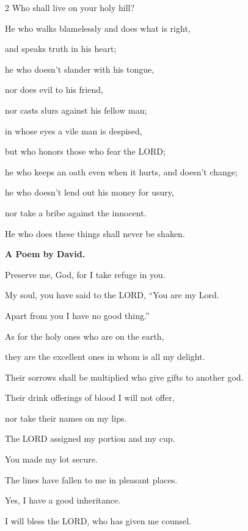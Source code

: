 \begin{multicols}{2}
	Who shall live on your holy hill?
	
	
	\myverse{}He who walks blamelessly and does what is right,
	
	and speaks truth in his heart;
	
	
	\myverse{}he who doesn’t slander with his tongue,
	
	nor does evil to his friend,
	
	nor casts slurs against his fellow man;
	
	
	\myverse{}in whose eyes a vile man is despised,
	
	but who honors those who fear the LORD;
	
	he who keeps an oath even when it hurts, and doesn’t change;
	
	
	\myverse{}he who doesn’t lend out his money for usury,
	
	nor take a bribe against the innocent.
	
	\vspace{\baselineskip}
	He who does these things shall never be shaken.
	
	
	\mychapter{}\textbf{A Poem by David.}
	
	\quad \myverse*{}Preserve me, God, for I take refuge in you.
	
	
	\myverse{}My soul, you have said to the LORD, “You are my Lord.
	
	Apart from you I have no good thing.”
	
	
	\myverse{}As for the holy ones who are on the earth,
	
	they are the excellent ones in whom is all my delight.
	
	\vspace{\baselineskip}
	
	\myverse{}Their sorrows shall be multiplied who give gifts to another god.
	
	Their drink offerings of blood I will not offer,
	
	nor take their names on my lips.
	
	
	\myverse{}The LORD assigned my portion and my cup.
	
	You made my lot secure.
	
	\vspace{\baselineskip}
	
	\myverse{}The lines have fallen to me in pleasant places.
	
	Yes, I have a good inheritance.
	
	
	\myverse{}I will bless the LORD, who has given me counsel.
	

\end{multicols}
